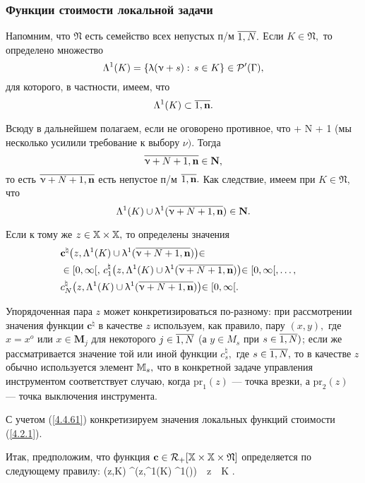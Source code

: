 \subsubsection*{Функции стоимости локальной задачи}

Напомним, что $\mathfrak{N}$
есть семейство всех непустых п/м $\ov{1,N}.$
Если $K\in \mathfrak{N},$
то определено множество
$$
  \Lambda^1(K) = \{\uplambda(\upnu+s):\,s\in K\}\in {\cal P}^\prime(\Gamma)
  ,
$$
для которого, в частности, имеем, что
$$
  \La^1(K) \subset \ov{1,\mathbf{n}}
  .
$$

Всюду в дальнейшем полагаем, если не оговорено противное, что
\bfn
  \label{4.4.60}
  \nu + N + 1 \leqslant {}
\efn
(мы несколько усилили требование к выбору $\nu).$
Тогда
$$
  \ov{\nu+N+1,\mathbf{n}}\in \mathbf{N}
  ,
$$
то есть
$\ov{\nu+N+1,\mathbf{n}}$
есть непустое п/м $\ov{1,\mathbf{n}}.$
Как следствие,
имеем при
$K\in \mathfrak{N},$ что
$$
  \La^1(K) \cup \la^1(\ov{\nu+N+1,\mathbf{n}})\in \mathbf{N}
  .
$$

Если к тому же
$z\in {\mathbb X} \times {\mathbb X},$ то определены значения
\begin{eqnarray}
  &\mathbf{c}^\natural\bigl(z,\La^1(K) \cup \la^1(\ov{\nu+N+1,\mathbf{n}})\bigl)\in
  &\nonumber\\
  &\in[0,\infty[,\,c_1^\natural\bigl(z,\La^1(K) \cup \la^1(\ov{\nu+N+1,\mathbf{n}})\bigl)\in [0,\infty[,\ldots,
  &\nonumber\\
  &c_N^\natural\bigl(z,\La^1(K) \cup \la^1(\ov{\nu+N+1,\mathbf{n}})\bigl)\in [0,\infty[
  .
  &
  \label{4.4.61}
\end{eqnarray}

Упорядоченная пара $z$ может конкретизироваться по-разному:
при рассмотрении значения функции $\mathbf{c}^\natural$
в качестве  $z$ используем,
как правило, пару $(x,y),$ где
$x= x^o$ или $x\in \mathbf{M}_j$ для некоторого
$j\in\ov{1,N}$
(а $y\in M_s$ при $s\in \ov{1,N})$;
если же рассматривается значение той или иной функции $c_s^\natural,$ где
$s\in \ov{1,N},$
то в качестве $z$ обычно используется элемент ${\mathbb M}_s,$
что в конкретной задаче управления инструментом соответствует случаю, когда
$\mathrm{pr}_1(z)$ --- точка врезки, а
$\mathrm{pr}_2(z)$ --- точка выключения инструмента.

С учетом (\ref{4.4.61})
конкретизируем значения локальных функций стоимости (\ref{4.2.1}).

Итак, предположим, что функция
$\mathbf{c}\in {\cal R}_+[{\mathbb X} \times {\mathbb X} \times \mathfrak{N}]$
определяется по следующему правилу:
\bfn
  \label{4.4.62}
  (z,K) \df {}^\natural\bigl(z,\La^1(K) \cup \la^1()\bigl)\ \ \fa z\in \bbx \times \bbx\ \ \fa K\in {}
  .
\efn

